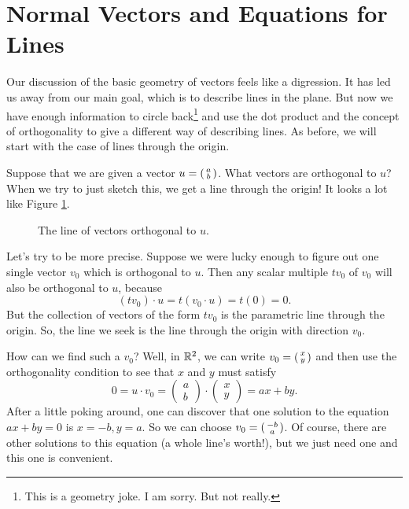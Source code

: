 \documentclass[00-livre-main.tex]{subfiles}
\begin{document}
\section*{Normal Vectors and Equations for Lines}

Our discussion of the basic geometry of vectors feels like a digression. It has led us away from our main goal, which is to describe lines in the plane. But now we have enough information to circle back\footnote{This is a geometry joke. I am sorry. But not really.} and use the dot product and the concept of orthogonality to give a different way of describing lines. As before, we will start with the case of lines through the origin.

Suppose that we are given a vector $u = \left(\begin{smallmatrix} a \\ b \end{smallmatrix}\right)$. What vectors are orthogonal to $u$? When we try to just sketch this, we get a line through the origin! It looks a lot like Figure \ref{figure:orthogonal-line}.
\begin{figure}[h]
\centering
{}
\caption{The line of vectors orthogonal to $u$.}
\label{figure:orthogonal-line}
\end{figure}


Let's try to be more precise. Suppose we were lucky enough to figure out one single vector $v_0$ which is orthogonal to $u$. Then any scalar multiple $tv_0$ of $v_0$ will also be orthogonal to $u$, because
\[
(tv_0)\cdot u = t(v_0\cdot u) = t(0) = 0.
\]
But the collection of vectors of the form $tv_0$ is the parametric line through the origin. So, the line we seek is the line through the origin with direction $v_0$.

How can we find such a $v_0$? Well, in $\mathbb{R}^2$, we can write $v_0 = \left(\begin{smallmatrix} x \\ y \end{smallmatrix}\right)$ and then use the orthogonality condition to see that $x$ and $y$ must satisfy
\[
0 = u\cdot v_0= \begin{pmatrix} a \\ b \end{pmatrix}\cdot \begin{pmatrix} x \\ y \end{pmatrix} = ax +by .
\]
After a little poking around, one can discover that one solution to the equation $ax+by=0$ is $x=-b, y=a$. So we can choose $v_0 = \left(\begin{smallmatrix} -b \\ a \end{smallmatrix}\right)$. Of course, there are 
other solutions to this equation (a whole line's worth!), but we just need one and this one is convenient. 
\end{document}

